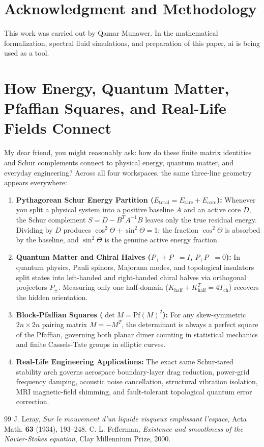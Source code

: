 \documentclass[11pt,a4paper]{article}
\theoremstyle{definition}
\begin{document}
\section*{Acknowledgment and Methodology}
This work was carried out by Qamar Munawer. In the mathematical formalization, spectral fluid simulations, and preparation of this paper, ai is being used as a tool.


\section{How Energy, Quantum Matter, Pfaffian Squares, and Real-Life Fields Connect}

My dear friend, you might reasonably ask: how do these finite matrix identities and Schur complements connect to physical energy, quantum matter, and everyday engineering? Across all four workspaces, the same three-line geometry appears everywhere:

\begin{enumerate}
  \item \textbf{Pythagorean Schur Energy Partition ($E_{\mathrm{total}} = E_{\mathrm{tare}} + E_{\mathrm{core}}$):} Whenever you split a physical system into a positive baseline $A$ and an active core $D$, the Schur complement $S = D - B^T A^{-1} B$ leaves only the true residual energy. Dividing by $D$ produces $\cos^2\Theta + \sin^2\Theta = 1$: the fraction $\cos^2\Theta$ is absorbed by the baseline, and $\sin^2\Theta$ is the genuine active energy fraction.
  \item \textbf{Quantum Matter and Chiral Halves ($P_+ + P_- = I$, $P_+ P_- = 0$):} In quantum physics, Pauli spinors, Majorana modes, and topological insulators split states into left-handed and right-handed chiral halves via orthogonal projectors $P_\pm$. Measuring only one half-domain ($K_{\mathrm{half}} + K_{\mathrm{half}}^T = 4 T_{\mathrm{ch}}$) recovers the hidden orientation.
  \item \textbf{Block-Pfaffian Squares ($\det M = \mathrm{Pf}(M)^2$):} For any skew-symmetric $2n \times 2n$ pairing matrix $M = -M^T$, the determinant is always a perfect square of the Pfaffian, governing both planar dimer counting in statistical mechanics and finite Cassels-Tate groups in elliptic curves.
  \item \textbf{Real-Life Engineering Applications:} The exact same Schur-tared stability arch governs aerospace boundary-layer drag reduction, power-grid frequency damping, acoustic noise cancellation, structural vibration isolation, MRI magnetic-field shimming, and fault-tolerant topological quantum error correction.
\end{enumerate}

\begin{thebibliography}{99}
 J. Leray, \emph{Sur le mouvement d'un liquide visqueux emplissant l'espace}, Acta Math. \textbf{63} (1934), 193--248.
 C. L. Fefferman, \emph{Existence and smoothness of the Navier-Stokes equation}, Clay Millennium Prize, 2000.
\end{thebibliography}
\end{document}

